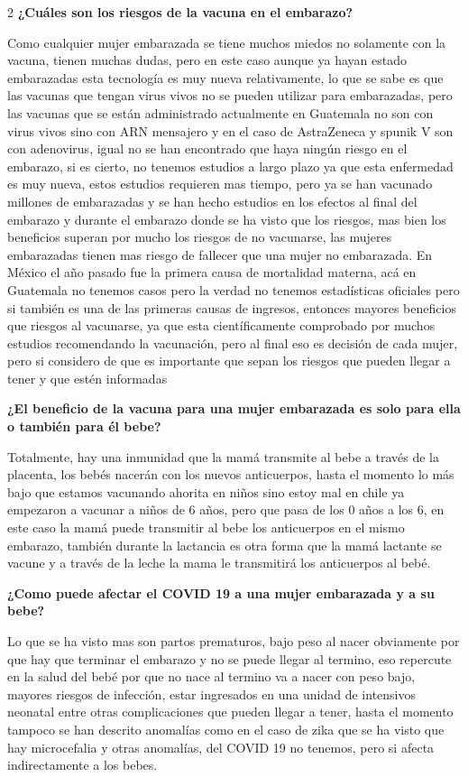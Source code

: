 \documentclass[12pt,spanish,Letterpaper,openany]{book}
\begin{document}
\begin {multicols}{2}
\textbf{¿Cuáles son los riesgos de la vacuna en el embarazo?}

Como cualquier mujer embarazada se tiene muchos miedos no solamente con la vacuna,
tienen muchas dudas, pero en este caso aunque ya hayan estado embarazadas esta tecnología
es muy nueva relativamente, lo que se sabe es que las vacunas que tengan virus vivos no se
pueden utilizar para embarazadas, pero las vacunas que se están administrado actualmente
en Guatemala no son con virus vivos sino con ARN mensajero y en el caso de AstraZeneca
y spunik V son con adenovirus, igual no se han encontrado que haya ningún riesgo en el
embarazo, si es cierto, no tenemos estudios a largo plazo ya que esta enfermedad es muy
nueva, estos estudios requieren mas tiempo, pero ya se han vacunado millones de
embarazadas y se han hecho estudios en los efectos al final del embarazo y durante el
embarazo donde se ha visto que los riesgos, mas bien los beneficios superan por mucho los
riesgos de no vacunarse, las mujeres embarazadas tienen mas riesgo de fallecer que una mujer
no embarazada. En México el año pasado fue la primera causa de mortalidad materna, acá en
Guatemala no tenemos casos pero la verdad no tenemos estadísticas oficiales pero si también
es una de las primeras causas de ingresos, entonces mayores beneficios que riesgos al
vacunarse, ya que esta científicamente comprobado por muchos estudios recomendando la
vacunación, pero al final eso es decisión de cada mujer, pero si considero de que es
importante que sepan los riesgos que pueden llegar a tener y que estén informadas

\textbf{¿El beneficio de la vacuna para una mujer embarazada es solo para ella o también para él bebe?}

Totalmente, hay una inmunidad que la mamá transmite al bebe a través de la placenta, los
bebés nacerán con los nuevos anticuerpos, hasta el momento lo más bajo que estamos
vacunando ahorita en niños sino estoy mal en chile ya empezaron a vacunar a niños de 6
años, pero que pasa de los 0 años a los 6, en este caso la mamá puede transmitir al bebe los
anticuerpos en el mismo embarazo, también durante la lactancia es otra forma que la mamá
lactante se vacune y a través de la leche la mama le transmitirá los anticuerpos al bebé.

\textbf{¿Como puede afectar el COVID 19 a una mujer embarazada y a su bebe?}

Lo que se ha visto mas son partos prematuros, bajo peso al nacer obviamente por que hay
que terminar el embarazo y no se puede llegar al termino, eso repercute en la salud del bebé
por que no nace al termino va a nacer con peso bajo, mayores riesgos de infección, estar
ingresados en una unidad de intensivos neonatal entre otras complicaciones que pueden llegar
a tener, hasta el momento tampoco se han descrito anomalías como en el caso de zika que se
ha visto que hay microcefalia y otras anomalías, del COVID 19 no tenemos, pero si afecta
indirectamente a los bebes.


\end{multicols}
\end{document}
